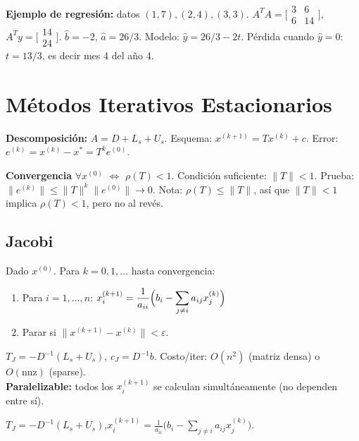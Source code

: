 \documentclass[12pt,a4paper]{article}
\begin{document}
\textbf{Ejemplo de regresión:} datos $(1,7),(2,4),(3,3)$.
$A^TA=\bigl[\begin{smallmatrix}3&6\\6&14\end{smallmatrix}\bigr]$, $A^Ty=\bigl[\begin{smallmatrix}14\\24\end{smallmatrix}\bigr]$.
$\hat b=-2$, $\hat a=26/3$. Modelo: $\hat y=26/3-2t$.
Pérdida cuando $\hat y=0$: $t=13/3$, es decir mes 4 del año 4.

\section{Métodos Iterativos Estacionarios}

\textbf{Descomposición:} $A=D+L_s+U_s$. Esquema: $x^{(k+1)}=Tx^{(k)}+c$.
Error: $e^{(k)}=x^{(k)}-x^*=T^ke^{(0)}$.

\begin{resultado}
\textbf{Convergencia} $\forall x^{(0)}$ $\Leftrightarrow$ $\rho(T)<1$. Condición suficiente: $\|T\|<1$.
Prueba: $\|e^{(k)}\|\le\|T\|^k\|e^{(0)}\|\to0$. Nota: $\rho(T)\le\|T\|$, así que $\|T\|<1$ implica $\rho(T)<1$, pero no al revés.
\end{resultado}

\subsection{Jacobi}

\begin{algoritmo}[title={Método de Jacobi}]
Dado $x^{(0)}$. Para $k=0,1,\ldots$ hasta convergencia:
\begin{enumerate}[noitemsep]
  \item Para $i=1,\ldots,n$: $x_i^{(k+1)}=\dfrac{1}{a_{ii}}\Bigl(b_i-\displaystyle\sum_{j\ne i}a_{ij}x_j^{(k)}\Bigr)$
  \item Parar si $\|x^{(k+1)}-x^{(k)}\|<\varepsilon$.
\end{enumerate}
$T_J=-D^{-1}(L_s+U_s)$, $c_J=D^{-1}b$. Costo/iter: $O(n^2)$ (matriz densa) o $O(\text{nnz})$ (sparse).\\
\textbf{Paralelizable:} todos los $x_i^{(k+1)}$ se calculan simultáneamente (no dependen entre sí).
\end{algoritmo}

$T_J=-D^{-1}(L_s+U_s)$,\quad $x_i^{(k+1)}=\tfrac{1}{a_{ii}}\bigl(b_i-\sum_{j\ne i}a_{ij}x_j^{(k)}\bigr)$.
\end{document}

